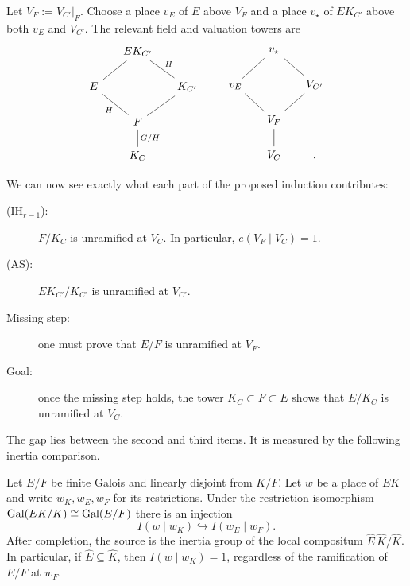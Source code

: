 Let $V_F:=V_{C'}|_F$. Choose a place $v_E$ of $E$ above $V_F$ and a place
$v_\star$ of $EK_{C'}$ above both $v_E$ and $V_{C'}$. The relevant field
and valuation towers are
\[
\begin{tikzcd}[row sep=1.6em, column sep=1.4em]
 &EK_{C'}\arrow[dl,dash]\arrow[dr,dash,"H"]&\\
 E\arrow[dr,dash,"H"']&&K_{C'}\arrow[dl,dash]\\
 &F\arrow[d,dash,"G/H"]&\\
 &K_C&
\end{tikzcd}
\qquad
\begin{tikzcd}[row sep=1.6em, column sep=1.4em]
 &v_\star\arrow[dl,dash]\arrow[dr,dash]&\\
 v_E\arrow[dr,dash]&&V_{C'}\arrow[dl,dash]\\
 &V_F\arrow[d,dash]&\\
 &V_C&.
\end{tikzcd}
\]

We can now see exactly what each part of the proposed induction contributes:
\begin{description}
  \item[\textnormal{(IH$_{r-1}$):}]
    $F/K_C$ is unramified at $V_C$. In particular,
    $e(V_F\mid V_C)=1$.
  \item[\textnormal{(AS):}]
    $EK_{C'}/K_{C'}$ is unramified at $V_{C'}$.
  \item[Missing step:]
    one must prove that $E/F$ is unramified at $V_F$.
  \item[Goal:]
    once the missing step holds, the tower
    $K_C\subset F\subset E$ shows that $E/K_C$ is unramified at $V_C$.
\end{description}

The gap lies between the second and third items. It is measured by the
following inertia comparison.

\begin{lemma}\label{lem:inertia-injection}
Let $E/F$ be finite Galois and linearly disjoint from $K/F$. Let $w$ be a
place of $EK$ and write $w_K,w_E,w_F$ for its restrictions. Under the
restriction isomorphism $\operatorname{Gal}(EK/K)\cong\operatorname{Gal}(E/F)$ there is an injection
\[
I(w\mid w_K)\hookrightarrow I(w_E\mid w_F).
\]
After completion, the source is the inertia group of the local compositum
$\widehat E\,\widehat K/\widehat K$. In particular, if
$\widehat E\subseteq\widehat K$, then $I(w\mid w_K)=1$, regardless of the
ramification of $E/F$ at $w_F$.
\end{lemma}

